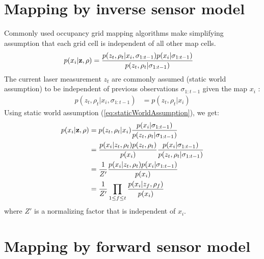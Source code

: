\documentclass[letterpaper, 10 pt, conference]{ieeeconf} %
\begin{document}
\section{Mapping by inverse sensor model}
Commonly used occupancy grid mapping algorithms make simplifying assumption
that each grid cell is independent of all other map cells. 
\begin{align}
  p(x_i|\mathbf{z}, \rho) &= \frac{p(z_t, \rho_t|x_i, \sigma_{1:t-1})p(x_i|\sigma_{1:t-1})}
                         {p(z_t, \rho_t|\sigma_{1:t-1})}
\end{align}
The current laser measurement $z_t$ are commonly assumed (static world assumption) \cite{thrun2003learning} to be independent of previous observations $\sigma_{1:t-1}$ given the map $x_i$ :
\begin{align}
  p(z_t, \rho_t|x_i, \sigma_{1:t-1}) &= p(z_t, \rho_t|x_i)
 \label{eq:staticWorldAssumption}
\end{align}
Using static world assumption (\eqref{eq:staticWorldAssumption}), we get:
\begin{align}
 p(x_i|\mathbf{z}, \rho) &= p(z_t, \rho_t|x_i)\frac{p(x_i|\sigma_{1:t-1})}
                                           {p(z_t, \rho_t|\sigma_{1:t-1})}\\
                 &= \frac{p(x_i|z_t, \rho_t)p(z_t,\rho_t)} {p(x_i)}\frac{p(x_i|\sigma_{1:t-1})}{p(z_t, \rho_t|\sigma_{1:t-1})}\\
                 &= \frac{1}{Z'}\frac{p(x_i|z_t, \rho_t)p(x_i|\sigma_{1:t-1})}{p(x_i)}\\
                 &= \frac{1}{Z'}\prod_{1\le f \le t} \frac{p(x_i|z_f, \rho_f)}{p(x_i)}
\end{align}
where $Z'$ is a normalizing factor that is independent of $x_i$.


\section{Mapping by forward sensor model}
\end{document}
